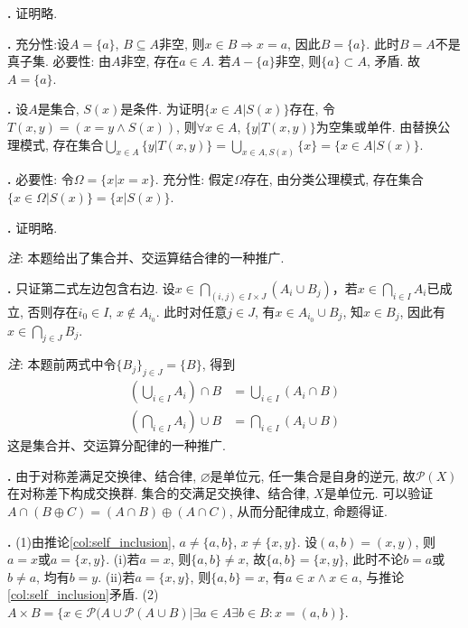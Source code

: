 \par \textbf{\thesolset .} 证明略.

\par \textbf{\thesolset .} 充分性:设$A=\{a\}$, $B\subseteq A$非空, 则$x\in B\Rightarrow x=a$, 因此$B=\{a\}$. 此时$B=A$不是真子集. 必要性: 由$A$非空, 存在$a\in A$. 若$A-\{a\}$非空, 则$\{a\}\subset A$, 矛盾. 故$A=\{a\}$.  

\par \textbf{\thesolset .} 设$A$是集合, $S(x)$是条件. 为证明$\{x\in A\vert S(x)\}$存在, 令$T(x,y)=(x=y\land S(x))$, 则$\forall x\in A$, $\{y\vert T(x,y)\}$为空集或单件. 由替换公理模式, 存在集合$\bigcup_{x\in A} \{y\vert T(x,y)\}=\bigcup_{x\in A, S(x)} \{x\}=\{x\in A\vert S(x)\}$. 

\par \textbf{\thesolset .} 必要性: 令$\Omega=\{x\vert x=x\}$. 充分性: 假定$\Omega$存在, 由分类公理模式, 存在集合$\{x\in \Omega\vert S(x)\}=\{x\vert S(x)\}$. 

\par \textbf{\thesolset .} 证明略. 
\par \emph{注}: 本题给出了集合并、交运算结合律的一种推广. 

\par \textbf{\thesolset .} 只证第二式左边包含右边. 设$x\in \bigcap_{(i,j)\in I\times J} (A_i\cup B_j)$，若$x\in \bigcap_{i\in I} A_i$已成立, 否则存在$i_0\in I$, $x\notin A_{i_0}$. 此时对任意$j\in J$, 有$x\in A_{i_0}\cup B_j$, 知$x\in B_j$, 因此有$x\in \bigcap_{j\in J} B_j$. 
\par \emph{注}: 本题前两式中令$\{B_j\}_{j\in J}=\{B\}$, 得到
\begin{align}
    \left(\bigcup_{i\in I}A_i\right)\cap B &= \bigcup_{i\in I} (A_i\cap B)\\
    \left(\bigcap_{i\in I}A_i\right)\cup B &= \bigcap_{i\in I} (A_i\cup B)
\end{align}
这是集合并、交运算分配律的一种推广. 

\par \textbf{\thesolset .} 由于对称差满足交换律、结合律, $\varnothing$是单位元, 任一集合是自身的逆元, 故$\mathcal{P}(X)$在对称差下构成交换群. 集合的交满足交换律、结合律, $X$是单位元. 可以验证$A\cap (B\oplus C)=(A\cap B)\oplus (A\cap C)$, 从而分配律成立, 命题得证. 

\par \textbf{\thesolset .} (1)由推论\ref{col:self_inclusion}, $a\neq \{a,b\}$, $x\neq \{x,y\}$. 设$(a,b)=(x,y)$, 则$a=x$或$a=\{x,y\}$. (i)若$a=x$, 则$\{a,b\}\neq x$, 故$\{a,b\}=\{x,y\}$, 此时不论$b=a$或$b\neq a$, 均有$b=y$. (ii)若$a=\{x,y\}$, 则$\{a,b\}=x$, 有$a\in x\land x\in a$, 与推论\ref{col:self_inclusion}矛盾. (2)$A\times B=\{x\in\mathcal{P}(A\cup \mathcal{P}(A\cup B)\vert \exists a\in A\exists b\in B: x=(a,b)\}$.

